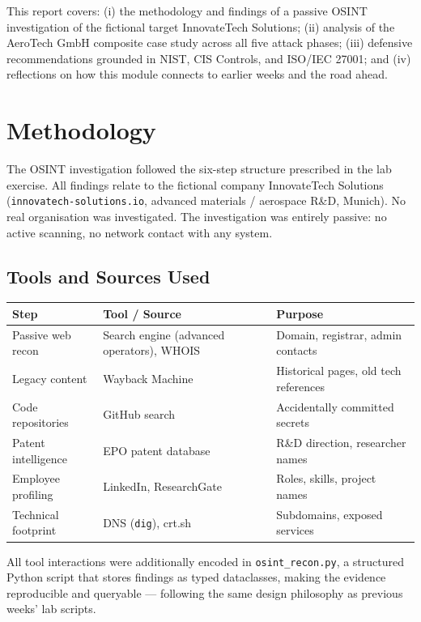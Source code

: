 \documentclass[11pt,a4paper]{article}
\begin{document}
This report covers: (i) the methodology and findings of a passive OSINT investigation of
the fictional target InnovateTech Solutions; (ii) analysis of the AeroTech GmbH composite
case study across all five attack phases; (iii) defensive recommendations grounded in NIST,
CIS Controls, and ISO/IEC 27001; and (iv) reflections on how this module connects to
earlier weeks and the road ahead.


\section{Methodology}

The OSINT investigation followed the six-step structure prescribed in the lab exercise.
All findings relate to the fictional company InnovateTech Solutions
(\texttt{innovatech-solutions.io}, advanced materials / aerospace R\&D, Munich).
No real organisation was investigated.  The investigation was entirely passive: no active
scanning, no network contact with any system.

\subsection{Tools and Sources Used}

\begin{center}
\small
\begin{tabular}{lll}
\toprule
Step & Tool / Source & Purpose \\
\midrule
Passive web recon  & Search engine (advanced operators), WHOIS & Domain, registrar, admin contacts \\
Legacy content     & Wayback Machine                           & Historical pages, old tech references \\
Code repositories  & GitHub search                             & Accidentally committed secrets \\
Patent intelligence & EPO patent database                      & R\&D direction, researcher names \\
Employee profiling & LinkedIn, ResearchGate                    & Roles, skills, project names \\
Technical footprint & DNS (\texttt{dig}), crt.sh               & Subdomains, exposed services \\
\bottomrule
\end{tabular}
\end{center}

\vspace{4pt}
\noindent
All tool interactions were additionally encoded in \texttt{osint\_recon.py}, a structured
Python script that stores findings as typed dataclasses, making the evidence reproducible
and queryable --- following the same design philosophy as previous weeks' lab scripts.
\end{document}
